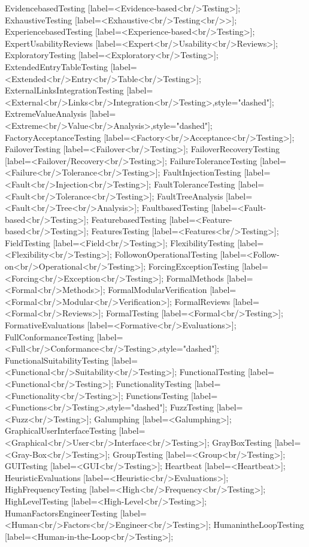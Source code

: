 \documentclass{article}
\begin{document}
{EvidencebasedTesting [label=<Evidence-based<br/>Testing>];
ExhaustiveTesting [label=<Exhaustive<br/>Testing<br/>>];
ExperiencebasedTesting [label=<Experience-based<br/>Testing>];
ExpertUsabilityReviews [label=<Expert<br/>Usability<br/>Reviews>];
ExploratoryTesting [label=<Exploratory<br/>Testing>];
ExtendedEntryTableTesting [label=<Extended<br/>Entry<br/>Table<br/>Testing>];
ExternalLinksIntegrationTesting [label=<External<br/>Links<br/>Integration<br/>Testing>,style="dashed"];
ExtremeValueAnalysis [label=<Extreme<br/>Value<br/>Analysis>,style="dashed"];
FactoryAcceptanceTesting [label=<Factory<br/>Acceptance<br/>Testing>];
FailoverTesting [label=<Failover<br/>Testing>];
FailoverRecoveryTesting [label=<Failover/Recovery<br/>Testing>];
FailureToleranceTesting [label=<Failure<br/>Tolerance<br/>Testing>];
FaultInjectionTesting [label=<Fault<br/>Injection<br/>Testing>];
FaultToleranceTesting [label=<Fault<br/>Tolerance<br/>Testing>];
FaultTreeAnalysis [label=<Fault<br/>Tree<br/>Analysis>];
FaultbasedTesting [label=<Fault-based<br/>Testing>];
FeaturebasedTesting [label=<Feature-based<br/>Testing>];
FeaturesTesting [label=<Features<br/>Testing>];
FieldTesting [label=<Field<br/>Testing>];
FlexibilityTesting [label=<Flexibility<br/>Testing>];
FollowonOperationalTesting [label=<Follow-on<br/>Operational<br/>Testing>];
ForcingExceptionTesting [label=<Forcing<br/>Exception<br/>Testing>];
FormalMethods [label=<Formal<br/>Methods>];
FormalModularVerification [label=<Formal<br/>Modular<br/>Verification>];
FormalReviews [label=<Formal<br/>Reviews>];
FormalTesting [label=<Formal<br/>Testing>];
FormativeEvaluations [label=<Formative<br/>Evaluations>];
FullConformanceTesting [label=<Full<br/>Conformance<br/>Testing>,style="dashed"];
FunctionalSuitabilityTesting [label=<Functional<br/>Suitability<br/>Testing>];
FunctionalTesting [label=<Functional<br/>Testing>];
FunctionalityTesting [label=<Functionality<br/>Testing>];
FunctionsTesting [label=<Functions<br/>Testing>,style="dashed"];
FuzzTesting [label=<Fuzz<br/>Testing>];
Galumphing [label=<Galumphing>];
GraphicalUserInterfaceTesting [label=<Graphical<br/>User<br/>Interface<br/>Testing>];
GrayBoxTesting [label=<Gray-Box<br/>Testing>];
GroupTesting [label=<Group<br/>Testing>];
GUITesting [label=<GUI<br/>Testing>];
Heartbeat [label=<Heartbeat>];
HeuristicEvaluations [label=<Heuristic<br/>Evaluations>];
HighFrequencyTesting [label=<High<br/>Frequency<br/>Testing>];
HighLevelTesting [label=<High-Level<br/>Testing>];
HumanFactorsEngineerTesting [label=<Human<br/>Factors<br/>Engineer<br/>Testing>];
HumanintheLoopTesting [label=<Human-in-the-Loop<br/>Testing>];
}
\end{document}
